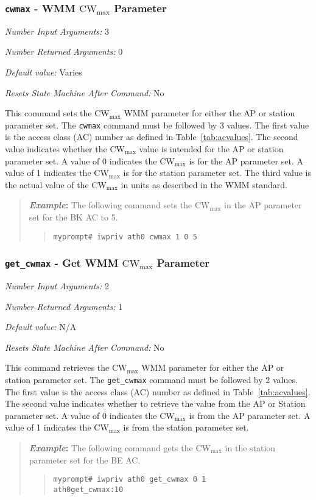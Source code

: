 \documentclass[10pt,fullpage]{article}
\newcommand{\mytt}[1]{{\texttt{#1}}}
\newcommand{\bv}{\begin{verse}}
\newcommand{\ev}{\end{verse}}
\newcommand{\cmd}[1]{{\texttt{myprompt\# #1}}}
\newcommand{\argdesc}[4]{\begin{description}
\itemsep -6pt
\item \textit{Number Input Arguments:} #1
\item \textit{Number Returned Arguments:} #2
\item \textit{Default value:} #3
\item \textit{Resets State Machine After Command:} #4
\end{description}
}
\newenvironment{example}{\begin{quote}\textbf{\textit{Example}:}}{\end{quote}}
\begin{document}
\subsubsection{\mytt{cwmax} - WMM $\mathrm{CW}_{\mathrm{max}}$ Parameter}
\argdesc{3}{0}{Varies}{No}
This command sets the $\mathrm{CW}_{\mathrm{max}}$ WMM parameter for
either the AP or station parameter set.  The \mytt{cwmax} command must
be followed by 3 values.  The first value is the access class (AC)
number as defined in Table~\ref{tab:acvalues}.  The second value
indicates whether the $\mathrm{CW}_{\mathrm{max}}$ value is intended
for the AP or station parameter set.  A value of 0 indicates the
$\mathrm{CW}_{\mathrm{max}}$ is for the AP parameter set.  A value of
1 indicates the $\mathrm{CW}_{\mathrm{max}}$ is for the station
parameter set.  The third value is the actual value of the
$\mathrm{CW}_{\mathrm{max}}$ in units as described in the WMM
standard.
\begin{example}
The following command sets the $\mathrm{CW}_{\mathrm{max}}$ in the
AP parameter set for the BK AC to 5.
\bv
\cmd{iwpriv ath0 cwmax 1 0 5}
\ev
\end{example}

\subsubsection{\mytt{get\_cwmax} - Get WMM $\mathrm{CW}_{\mathrm{max}}$ Parameter}
\argdesc{2}{1}{N/A}{No}
This command retrieves the $\mathrm{CW}_{\mathrm{max}}$ WMM parameter
for either the AP or station parameter set. The \mytt{get\_cwmax}
command must be followed by 2 values.  The first value is the access
class (AC) number as defined in Table~\ref{tab:acvalues}.  The second
value indicates whether to retrieve the value from the AP or Station
parameter set. A value of 0 indicates the $\mathrm{CW}_{\mathrm{max}}$
is from the AP parameter set.  A value of 1 indicates the
$\mathrm{CW}_{\mathrm{max}}$ is from the station parameter set.
\begin{example}
  The following command gets the $\mathrm{CW}_{\mathrm{max}}$ in the
  station parameter set for the BE AC.
  \bv
  \cmd{iwpriv ath0 get\_cwmax 0 1}\\
  \mytt{ath0\hspace{32pt}get\_cwmax:10}
  \ev
\end{example}
\end{document}
